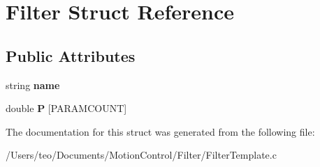 \hypertarget{struct_filter}{}\section{Filter Struct Reference}
\label{struct_filter}
\subsection*{Public Attributes}
\begin{DoxyCompactItemize}
\item 
\mbox{\label{struct_filter_ac712a4d7b66a3cf399e660d5ba4c66fa}} 
string {\bfseries name}
\item 
\mbox{\label{struct_filter_ab4408380251a5bef3e6eb2902c412450}} 
double {\bfseries P} \mbox{[}P\+A\+R\+A\+M\+C\+O\+U\+NT\mbox{]}
\end{DoxyCompactItemize}


The documentation for this struct was generated from the following file\+:\begin{DoxyCompactItemize}
\item 
/\+Users/teo/\+Documents/\+Motion\+Control/\+Filter/Filter\+Template.\+c\end{DoxyCompactItemize}
